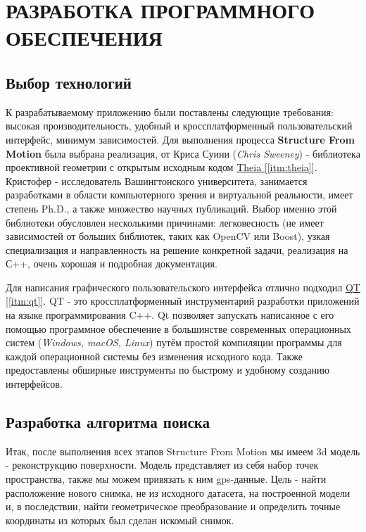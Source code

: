 \chapter{РАЗРАБОТКА ПРОГРАММНОГО ОБЕСПЕЧЕНИЯ}

\section{Выбор технологий}

К разрабатываемому приложению были поставлены следующие требования: высокая производительность, удобный и кроссплатформенный пользовательский интерфейс, минимум зависимостей. Для выполнения процесса \textbf{Structure From Motion} была выбрана реализация, от Криса Суини (\textit{Chris Sweeney}) - библиотека проективной геометрии с открытым исходным кодом \hyperref[itm:theia]{Theia [\ref{itm:theia}]}. Кристофер - исследователь Вашингтонского университета, занимается разработками в области компьютерного зрения и виртуальной реальности, имеет степень Ph.D., а также множество научных публикаций. Выбор именно этой библиотеки обусловлен несколькими причинами: легковесность (не имеет зависимостей от больших библиотек, таких как OpenCV или Boost), узкая специализация и направленность на решение конкретной задачи, реализация на С++, очень хорошая и подробная документация. 

Для написания графического пользовательского интерфейса отлично подходил \hyperref[itm:qt]{QT [\ref{itm:qt}]}. QT - это кроссплатформенный инструментарий разработки приложений на языке программирования C++. Qt позволяет запускать написанное с его помощью программное обеспечение в большинстве современных операционных систем (\textit{Windows, macOS, Linux}) путём простой компиляции программы для каждой операционной системы без изменения исходного кода. Также предоставлены обширные инструменты по быстрому и удобному созданию интерфейсов.

\section{Разработка алгоритма поиска}
Итак, после выполнения всех этапов Structure From Motion мы имеем 3d модель - реконструкцию поверхности. Модель представляет из себя набор точек пространства, также мы можем привязать к ним gps-данные. Цель - найти расположение нового снимка, не из исходного датасета, на построенной модели и, в последствии, найти геометрическое преобразование и определить точные координаты из которых был сделан искомый снимок.

